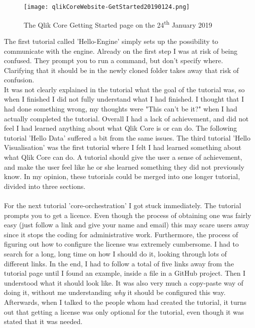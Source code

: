 \documentclass{cslthse-msc}
\begin{document}
    \begin{figure}[H]
        \centering
        \texttt{[image: qlikCoreWebsite-GetStarted20190124.png]}
        \caption{The Qlik Core Getting Started page on the 24\textsuperscript{th} January 2019}
        \label{fig:gettingstarted}
    \end{figure}
    The first tutorial called 'Hello-Engine' simply sets up the possibility to communicate with the engine. Already on the first step I was at risk of being confused. They prompt you to run a command, but don't specify where. Clarifying that it should be in the newly cloned folder takes away that risk of confusion.\\It was not clearly explained in the tutorial what the goal of the tutorial was, so when I finished I did not fully understand what I had finished. I thought that I had done something wrong, my thoughts were "This can't be it?" when I had actually completed the tutorial. Overall I had a lack of achievement, and did not feel I had learned anything about what Qlik Core is or can do. The following tutorial 'Hello Data' suffered a bit from the same issues. The third tutorial 'Hello Visualisation' was the first tutorial where I felt I had learned something about what Qlik Core can do. A tutorial should give the user a sense of achievement, and make the user feel like he or she learned something they did not previously know. In my opinion, these tutorials could be merged into one longer tutorial, divided into three sections. \\\\
    For the next tutorial 'core-orchestration' I got stuck immediately. The tutorial prompts you to get a licence. Even though the process of obtaining one was fairly easy (just follow a link and give your name and email) this may scare users away since it stops the coding for administrative work. Furthermore, the process of figuring out how to configure the license was extremely cumbersome. I had to search for a long, long time on how I should do it, looking through lots of different links. In the end, I had to follow a total of five links away from the tutorial page until I found an example, inside a file in a GitHub project. Then I understood what it should look like. It was also very much a copy-paste way of doing it, without me understanding \textit{why} it should be configured this way. Afterwards, when I talked to the people whom had created the tutorial, it turns out that getting a license was only optional for the tutorial, even though it was stated that it was needed.\\\\
\end{document}
